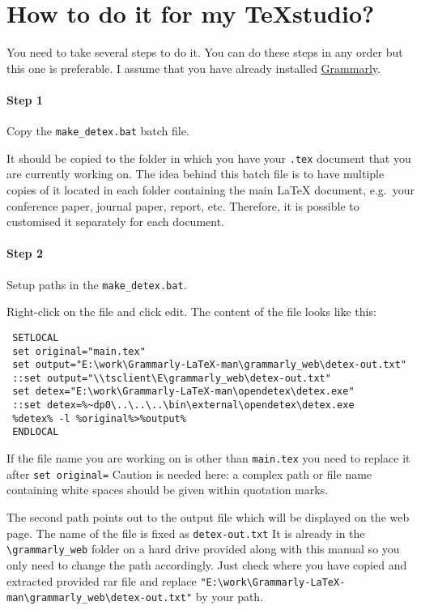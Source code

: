 \documentclass[]{spie}  %
\begin{document}
\section{How to do it for my TeXstudio?}
You need to take several steps to do it. You can do these steps in any order but this one is preferable. I assume that you have already installed \href{https://www.grammarly.com}{Grammarly}.
\paragraph{Step 1} Copy  the \verb|make_detex.bat| batch file. 

It should be copied to the folder in which you have your \verb|.tex| document that you are currently working on.
The idea behind this batch file is to have multiple copies of it located in each folder containing the main LaTeX document, e.g.\ your conference paper, journal paper, report, etc.
Therefore, it is possible to customised it separately for each document.

\paragraph{Step 2} Setup paths in the \verb|make_detex.bat|. 

Right-click on the file and click edit.
The content of the file looks like this:
 \begin{verbatim}
 SETLOCAL
 set original="main.tex"
 set output="E:\work\Grammarly-LaTeX-man\grammarly_web\detex-out.txt"
 ::set output="\\tsclient\E\grammarly_web\detex-out.txt"
 set detex="E:\work\Grammarly-LaTeX-man\opendetex\detex.exe"
 ::set detex=%~dp0\..\..\..\bin\external\opendetex\detex.exe
 %detex% -l %original%>%output%
 ENDLOCAL
 \end{verbatim}
If the file name you are working on is other than \verb|main.tex| you need to replace it after \verb|set original=|
Caution is needed here: a complex path or file name containing white spaces should be given within quotation marks.

The second path points out to the output file which will be displayed on the web page. The name of the file is fixed as \verb|detex-out.txt|
It is already in the \verb|\grammarly_web| folder on a hard drive provided along with this manual so you only need to change the path accordingly. 
Just check where you have copied and extracted provided rar file and replace \verb|"E:\work\Grammarly-LaTeX-man\grammarly_web\detex-out.txt"| by your path.
\end{document}
